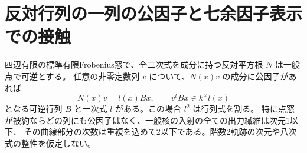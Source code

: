 \section{反対行列の一列の公因子と七余因子表示での接触}
\label{sec:opposite-column-divisor}
\begin{theorem}\label{thm:opposite-column-divisor}
四辺有限の標準有限Frobenius窓で、全二次式を成分に持つ反対平方根 $N$ は一般点で可逆とする。
任意の非零定数列 $v$ について、$N(x)v$ の成分に公因子があれば
\[
                    N(x)v=l(x) Bx,\qquad v^t Bx\in k^\times l(x)
\]
となる可逆行列 $B$ と一次式 $l$ がある。この場合 $l^2$ は行列式を割る。
特に点窓が被約ならどの列にも公因子はなく、一般核の入射の全ての出力繊維は次元1以下、
その曲線部分の次数は重複を込めて2以下である。階数2軌跡の次元や八次式の整性を仮定しない。
\end{theorem}
